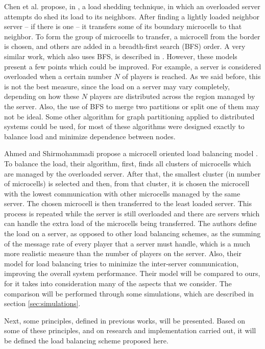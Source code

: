 Chen et al. propose, in \cite{chen2005lad}, a load shedding technique, in which an overloaded server attempts do shed its load to its neighbors. After finding a lightly loaded neighbor server -- if there is one -- it transfers some of its boundary microcells to that neighbor. To form the group of microcells to transfer, a microcell from the border is chosen, and others are added in a breadth-first search (BFS) order. A very similar work, which also uses BFS, is described in \cite{duong2003dls}. However, these models present a few points which could be improved. For example, a server is considered overloaded when a certain number $N$ of players is reached. As we said before, this is not the best measure, since the load on a server may vary completely, depending on how these $N$ players are distributed across the region managed by the server. Also, the use of BFS to merge two partitions or split one of them may not be ideal. Some other algorithm for graph partitioning applied to distributed systems \cite{kernighan1970ehp,fiduccia1982lth,karypis1999fah,hendrickson1995isg} could be used, for most of these algorithms were designed exactly to balance load and minimize dependence between nodes.

Ahmed and Shirmohammadi propose a microcell oriented load balancing model \cite{ahmed2008mol}. To balance the load, their algorithm, first, finds all clusters of microcells which are managed by the overloaded server. After that, the smallest cluster (in number of microcells) is selected and then, from that cluster, it is chosen the microcell with the lowest communication with other microcells managed by the same server. The chosen microcell is then transferred to the least loaded server. This process is repeated while the server is still overloaded and there are servers which can handle the extra load of the microcells being transferred. The authors define the load on a server, as opposed to other load balancing schemes, as the summing of the message rate of every player that a server must handle, which is a much more realistic measure than the number of players on the server. Also, their model for load balancing tries to minimize the inter-server communication, improving the overall system performance. Their model will be compared to ours, for it takes into consideration many of the aspects that we consider. The comparison will be performed through some simulations, which are described in section \ref{sec:simulations}.

Next, some principles, defined in previous works, will be presented. Based on some of these principles, and on research and implementation carried out, it will be defined the load balancing scheme proposed here.

